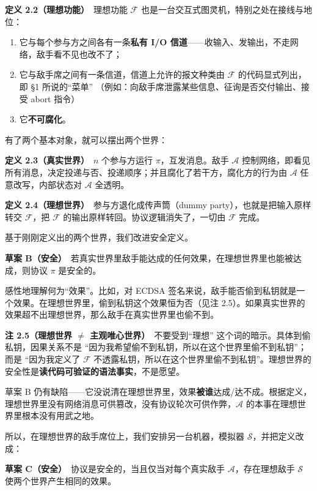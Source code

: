 \textbf{定义
2.2（理想功能）}　理想功能 $\mathcal{F}$ 也是一台交互式图灵机，特别之处在接线与地位：

\begin{enumerate}
\def\labelenumi{\arabic{enumi}.}

\item
  它与每个参与方之间各有一条\textbf{私有 I/O
  信道}------收输入、发输出，不走网络，敌手看不见也改不了；
\item
  它与敌手席之间有一条信道，信道上允许的报文种类由 $\mathcal{F}$ 的代码显式列出，即
  §1 所说的“菜单”
（例如：向敌手席泄露某些信息、征询是否交付输出、接受 abort 指令）
\item
  它\textbf{不可腐化}。
\end{enumerate}

有了两个基本对象，就可以摆出两个世界：

\textbf{定义
2.3（真实世界）}　$n$ 个参与方运行 $\pi$，互发消息。敌手 $\mathcal{A}$ 控制网络，即看见所有消息，决定投递与否、投递顺序；并且腐化了若干方，腐化方的行为由 $\mathcal{A}$ 任意改写，内部状态对 $\mathcal{A}$ 全透明。

\textbf{定义 2.4（理想世界）}　参与方退化成传声筒（dummy
party），也就是把输入原样转交 $\mathcal{F}$，把 $\mathcal{F}$ 的输出原样转回。协议逻辑消失了，一切由 $\mathcal{F}$ 完成。

基于刚刚定义出的两个世界，我们改进安全定义。

\textbf{草案
B（安全）}　若真实世界里敌手能达成的任何效果，在理想世界里也能被达成，则协议 $\pi$ 是安全的。

感性地理解何为“效果”。比如，对 ECDSA
签名来说，敌手能否偷到私钥就是一个效果。在理想世界里，偷到私钥这个效果恒为否（见注
2.5）。如果真实世界的效果超不出理想世界，那么敌手在真实世界里也偷不到。

\textbf{注 2.5（理想世界 $\neq$ 主观唯心世界）}　不要受到“理想”
这个词的暗示。具体到偷私钥，因果关系不是
“因为我希望偷不到私钥，所以在这个世界里偷不到私钥”；而是
“因为我定义了 $\mathcal{F}$ 不透露私钥，所以在这个世界里偷不到私钥”。理想世界的安全性是\textbf{读代码可验证的语法事实}，不是愿望。

草案 B
仍有缺陷------它没说清在理想世界里，效果\textbf{被谁}达成/达不成。根据定义，理想世界里没有网络消息可供篡改，没有协议轮次可供作弊，$\mathcal{A}$ 的本事在理想世界里根本没有用武之地。

所以，在理想世界的敌手席位上，我们安排另一台机器，模拟器 $\mathcal{S}$，并把定义改成：

\textbf{草案
C（安全）}　协议是安全的，当且仅当对每个真实敌手 $\mathcal{A}$，存在理想敌手 $\mathcal{S}$ 使两个世界产生相同的效果。

